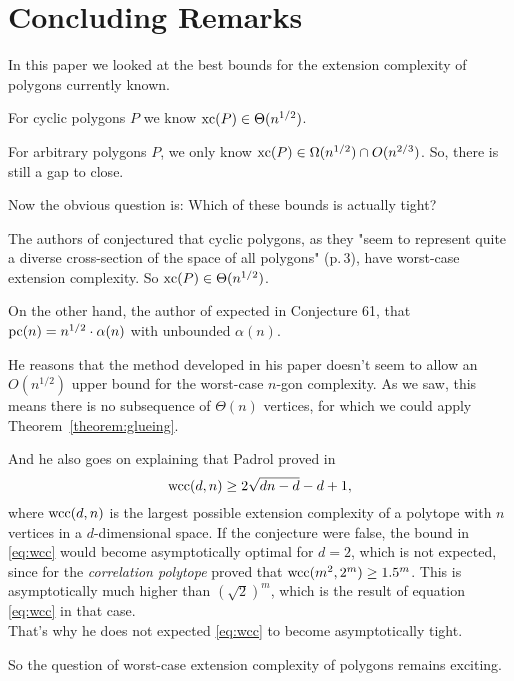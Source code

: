 \section{Concluding Remarks}

In this paper we looked at the best bounds for the extension complexity of polygons currently known. 

For cyclic polygons $P$ we know $\operatorname{xc}(P) \in \Theta(n^{1/2})$.

For arbitrary polygons $P$, we only know $\operatorname{xc}(P) \in \Omega(n^{1/2}) \cap O(n^{2/3})$. So, there is still a gap to close.

Now the obvious question is: Which of these bounds is actually tight?

The authors of \cite{kwan2020extension} conjectured that cyclic polygons, as they "seem to represent quite a diverse cross-section of the space of all polygons" (p.\,3), have worst-case extension complexity. So $\operatorname{xc}(P) \in \Theta(n^{1/2})$.

On the other hand, the author of \cite{shitov2020sublinear} expected in Conjecture 61, that $\operatorname{pc}(n) = n^{1/2} \cdot \alpha(n)$ with unbounded $\alpha(n)$.

He reasons that the method developed in his paper doesn't seem to allow an $O(n^{1/2})$ upper bound for the worst-case $n$-gon complexity. As we saw, this means there is no subsequence of $\Theta(n)$ vertices, for which we could apply Theorem~\ref{theorem:glueing}.

And he also goes on explaining that Padrol proved in \cite{padrol2016extension} 
\begin{equation}\label{eq:wcc}
  \operatorname{wcc}(d,n) \geq 2\sqrt{dn-d}-d+1 ,
\end{equation}
where $\operatorname{wcc}(d,n)$ is the largest possible extension complexity of a polytope with $n$ vertices in a $d$-dimensional space. 
If the conjecture were false, the bound in \eqref{eq:wcc} would become asymptotically optimal for $d=2$, which is not expected, since for the \emph{correlation polytope} \cite{kaibel2015short} proved that $\operatorname{wcc}(m^2,2^m) \geq 1.5^m$. This is asymptotically much higher than $(\sqrt{2})^m$, which is the result of equation \eqref{eq:wcc} in that case.\\
That's why he does not expected \eqref{eq:wcc} to become asymptotically tight.

So the question of worst-case extension complexity of polygons remains exciting.
